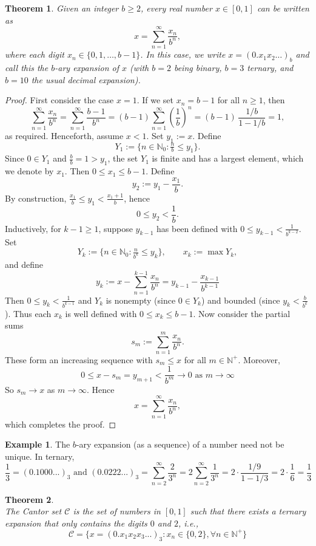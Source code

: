 \documentclass{article}
\theoremstyle{plain}
\newtheorem{thm}{Theorem}[section]
\theoremstyle{definition}
\newtheorem*{ex}{Example}
\theoremstyle{remark}
\begin{document}
\newpage

\begin{thm}\label{thm:b-ary}
    Given an integer $b \geq 2$, every real number $x \in [0,1]$ can be written as
    \[
        x = \sum_{n=1}^\infty \frac{x_n}{b^n},
    \]
    where each digit $x_n \in \{0,1,\dots,b-1\}$. In this case, we write $x = (0.x_1x_2\ldots)_b$ and call this the \emph{$b$-ary expansion} of $x$ (with $b=2$ being binary, $b=3$ ternary, and $b=10$ the usual decimal expansion).
\end{thm}

\begin{proof}
    First consider the case $x=1$. If we set $x_n = b-1$ for all $n \geq 1$, then
    \[
        \sum_{n=1}^\infty \frac{x_n}{b^n} 
        = \sum_{n=1}^\infty \frac{b-1}{b^n} 
        = (b-1) \sum_{n=1}^\infty \left(\frac{1}{b}\right)^n
        = (b-1)\,\frac{1/b}{1-1/b} 
        = 1,
    \]
    as required. Henceforth, assume $x < 1$. Set $y_1 := x$. Define
    \[
        Y_1 := \{n \in \mathbb{N}_0 : \tfrac{n}{b} \leq y_1\}.
    \]
    Since $0 \in Y_1$ and $\tfrac{b}{b} = 1 > y_1$, the set $Y_1$ is finite and has a largest element, which we denote by $x_1$. Then $0 \leq x_1 \leq b-1$. Define
    \[
        y_2 := y_1 - \frac{x_1}{b}.
    \]
    By construction, $\tfrac{x_1}{b} \leq y_1 < \tfrac{x_1+1}{b}$, hence
    \[
        0 \leq y_2 < \frac{1}{b}.
    \]
    Inductively, for $k -1 \ge 1$, suppose $y_{k-1}$ has been defined with $0 \leq y_{k-1} < \tfrac{1}{b^{k-2}}$. Set
    \[
        Y_k := \{n \in \mathbb{N}_0 : \tfrac{n}{b^k} \leq y_k\}, 
        \qquad x_k := \max Y_k,
    \]
    and define
    \[
        y_k := x - \sum_{n=1}^{k-1} \frac{x_n}{b^n} = y_{k-1} - \frac{x_{k-1}}{b^{k-1}}
    \]
    Then $0 \leq y_k < \tfrac{1}{b^{k-1}}$ and $Y_k$ is nonempty (since $0 \in Y_k$) and bounded (since $y_k < \tfrac{b}{b^k}$). Thus each $x_k$ is well defined with $0 \leq x_k \leq b-1$. Now consider the partial sums
    \[
        s_m := \sum_{n=1}^m \frac{x_n}{b^n}.
    \]
    These form an increasing sequence with $s_m \leq x$ for all $m \in \mathbb{N}^+$. Moreover,
    \[
        0 \le x - s_m = y_{m+1} < \frac{1}{b^m} \to 0 \text{ as } m \to \infty
    \]
    So $s_m \to x$ as $m \to \infty$. Hence
    \[
        x = \sum_{n=1}^\infty \frac{x_n}{b^n},
    \]
    which completes the proof.
\end{proof}
\begin{ex}
    The $b$-ary expansion (as a sequence) of a number need not be unique. In ternary, \[
    \frac{1}{3} = (0.1000...)_3 \text{ and } (0.0222...)_3 = \sum \limits _{n=2}^{\infty} \frac{2}{3^n} = 2 \sum \limits _{n=2}^{\infty} \frac{1}{3^n} = 2 \cdot \frac{1/9}{1-1/3} = 2\cdot \frac{1}{6} = \frac{1}{3}
    \]
\end{ex}
\newpage
\begin{thm}\label{thm:cantor_form}~\\
    The Cantor set $\mathcal{C}$ is the set of numbers in $[0,1]$ such that there exists a ternary expansion that only contains the digits $0$ and $2$, i.e., \[
    \mathcal{C} = \{x = (0.x_1x_2x_3...)_3 : x_n \in \{0,2\}, \forall n \in \mathbb{N}^+\}
    \]
\end{thm}
\end{document}
